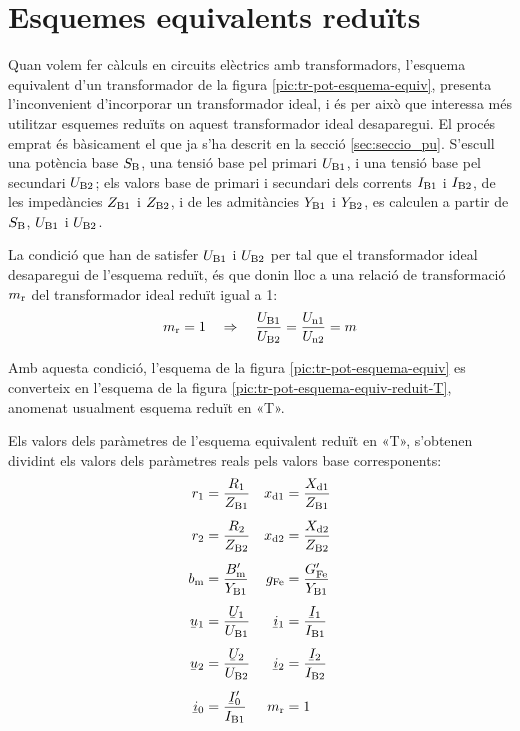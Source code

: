 \section{Esquemes equivalents reduïts}

Quan  volem fer càlculs en circuits elèctrics amb transformadors, l'esquema equivalent d'un transformador de la figura  \vref{pic:tr-pot-esquema-equiv}, presenta l'inconvenient d'incorporar un transformador ideal, i és per això que interessa més utilitzar esquemes reduïts on aquest transformador ideal desaparegui.
El procés emprat és bàsicament el que ja s'ha descrit en la secció \vref{sec:seccio_pu}. S'escull una potència base $S_\mathrm{B}$, una tensió base pel primari $U_\mathrm{B1}$, i una tensió base pel secundari $U_\mathrm{B2}$; els valors base de primari i secundari dels corrents $I_\mathrm{B1}$ i $I_\mathrm{B2}$, de les impedàncies $Z_\mathrm{B1}$ i $Z_\mathrm{B2}$, i de les admitàncies $Y_\mathrm{B1}$ i $Y_\mathrm{B2}$, es calculen a partir de $S_\mathrm{B}$, $U_\mathrm{B1}$ i $U_\mathrm{B2}$.

La condició que han de satisfer $U_\mathrm{B1}$ i $U_\mathrm{B2}$ per tal que el transformador ideal desaparegui de l'esquema reduït, és que donin lloc a una relació de transformació $m_\mathrm{r}$ del transformador ideal reduït igual a  1:
\begin{equation}\label{eq:mr}
    m_\mathrm{r} = 1 \quad \Rightarrow \quad \frac{U_\mathrm{B1}}{U_\mathrm{B2}} = \frac{U_\mathrm{n1}}{U_\mathrm{n2}} = m
\end{equation}

 Amb aquesta condició, l'esquema de la figura \vref{pic:tr-pot-esquema-equiv} es converteix en l'esquema de la figura
\vref{pic:tr-pot-esquema-equiv-reduit-T}, anomenat usualment esquema reduït en «T».

\begin{center}
    
    \label{pic:tr-pot-esquema-equiv-reduit-T}
\end{center}

Els valors dels paràmetres de l'esquema equivalent reduït en «T», s'obtenen dividint els valors dels paràmetres reals pels valors base corresponents:
\begin{align}
    r\ped{1} &=\frac{R\ped{1}}{Z\ped{B1}} &   x\ped{d1} &=\frac{X\ped{d1}}{Z\ped{B1}} \\[1ex]
    r\ped{2} &=\frac{R\ped{2}}{Z\ped{B2}} &   x\ped{d2} &=\frac{X\ped{d2}}{Z\ped{B2}} \\[1ex]
    b\ped{m} &=\frac{B\ped{m}'}{Y\ped{B1}}  &   g\ped{Fe} &=\frac{G\ped{Fe}'}{Y\ped{B1}} \\[1ex]
    \cmplx{u}_1 &=\frac{\cmplx{U}_1}{U\ped{B1}} &   \cmplx{i}_1 &=\frac{\cmplx{I}_1}{I\ped{B1}} \\[1ex]
    \cmplx{u}_2 &=\frac{\cmplx{U}_2}{U\ped{B2}} &   \cmplx{i}_2 &=\frac{\cmplx{I}_2}{I\ped{B2}} \\[1ex]
    \cmplx{i}_0 &=\frac{\cmplx{I}_0'}{I\ped{B1}} &   m\ped{r} &=1
\end{align}

